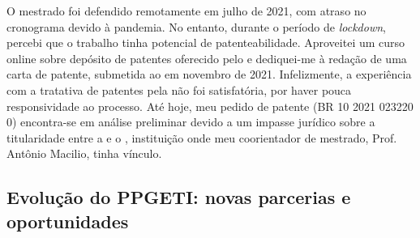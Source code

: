 \documentclass{article}
\begin{document}
O mestrado foi defendido remotamente em julho de 2021, com atraso no cronograma devido à pandemia. No entanto, durante o período de \textit{lockdown}, percebi que o trabalho tinha potencial de patenteabilidade. Aproveitei um curso online sobre depósito de patentes oferecido pelo  e dediquei-me à redação de uma carta de patente, submetida ao  em novembro de 2021. Infelizmente, a experiência com a tratativa de patentes pela  não foi satisfatória, por haver pouca responsividade ao processo. Até hoje, meu pedido de patente (BR 10 2021 023220 0) encontra-se em análise preliminar devido a um impasse jurídico sobre a titularidade entre a  e o , instituição onde meu coorientador de mestrado, Prof. Antônio Macilio, tinha vínculo.

\subsection{Evolução do PPGETI: novas parcerias e oportunidades}
\end{document}

